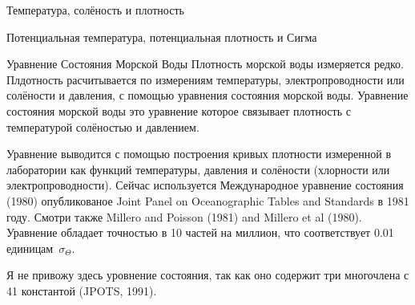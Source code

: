 \begin{chapter}{Температура, солёность и плотность}
\begin{section}{Потенциальная температура, потенциальная плотность и Сигма}
\begin{paragraph}{Уравнение Состояния Морской Воды}
Плотность морской воды измеряется редко. Плдотность расчитывается по
измерениям температуры, электропроводности или солёности и давления, с
помощью уравнения состояния морской воды. Уравнение состояния морской
воды это уравнение которое связывает плотность с температурой
солёностью и давлением.
%

Уравнение выводится с помощью построения кривых плотности измеренной в
лаборатории как функций температуры, давления и солёности (хлорности
или электропроводности). Сейчас используется Международное уравнение
состояния (1980) опубликованое Joint Panel on Oceanographic Tables and
Standards в 1981 году. Смотри также Millero and Poisson (1981) and
Millero et al (1980). Уравнение обладает точностью в 10 частей на
миллион, что соответствует 0.01 единицам~$\sigma_\Theta$.
%

Я не привожу здесь уровнение состояния, так как оно содержит три
многочлена с 41 константой (JPOTS, 1991).
%
\end{paragraph}


\end{section}
\end{chapter}
